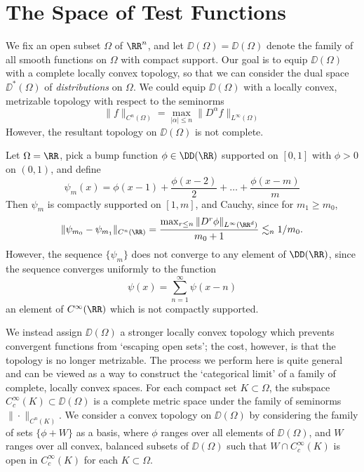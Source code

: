 \section{The Space of Test Functions}

We fix an open subset $\Omega$ of $\RR^n$, and let $\DD(\Omega) = \DD(\Omega)$ denote the family of all smooth functions on $\Omega$ with compact support. Our goal is to equip $\DD(\Omega)$ with a complete locally convex topology, so that we can consider the dual space $\DD^*(\Omega)$ of \emph{distributions} on $\Omega$. We could equip $\DD(\Omega)$ with a locally convex, metrizable topology with respect to the seminorms
%
\[ \| f \|_{C^n(\Omega)} = \max_{|\alpha| \leq n} \| D^\alpha f \|_{L^\infty(\Omega)} \]
%
However, the resultant topology on $\DD(\Omega)$ is not complete.

\begin{example}
    Let $\Omega = \RR$, pick a bump function $\phi \in \DD(\RR)$ supported on $[0,1]$ with $\phi > 0$ on $(0,1)$, and define
    \[ \psi_m(x) = \phi(x-1) + \frac{\phi(x-2)}{2} + \dots + \frac{\phi(x-m)}{m} \]
    Then $\psi_m$ is compactly supported on $[1,m]$, and Cauchy, since for $m_1 \geq m_0$,
    \[ \| \psi_{m_0} - \psi_{m_1} \|_{C^n(\RR)} = \frac{ \max_{r \leq n} \| D^r \phi \|_{L^\infty(\RR^d)}}{m_0+1} \lesssim_n 1/m_0. \]
    However, the sequence $\{ \psi_m \}$ does not converge to any element of $\DD(\RR)$, since the sequence converges uniformly to the function
    \[ \psi(x) = \sum_{n = 1}^\infty \psi(x-n) \]
    an element of $C^\infty(\RR)$ which is not compactly supported.
\end{example}

We instead assign $\DD(\Omega)$ a stronger locally convex topology which prevents convergent functions from `escaping open sets'; the cost, however, is that the topology is no longer metrizable. The process we perform here is quite general and can be viewed as a way to construct the `categorical limit' of a family of complete, locally convex spaces. For each compact set $K \subset \Omega$, the subspace $C_c^\infty(K) \subset \DD(\Omega)$ is a complete metric space under the family of seminorms $\| \cdot \|_{C^n(K)}$. We consider a convex topology on $\DD(\Omega)$ by considering the family of sets $\{ \phi + W \}$ as a basis, where $\phi$ ranges over all elements of $\DD(\Omega)$, and $W$ ranges over all convex, balanced subsets of $\DD(\Omega)$ such that $W \cap C_c^\infty(K)$ is open in $C_c^\infty(K)$ for each $K \subset \Omega$.

